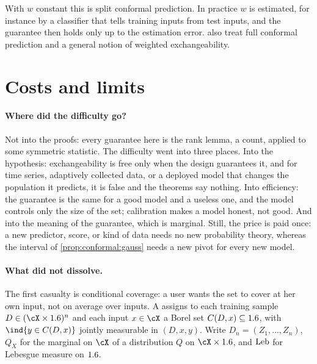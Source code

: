 \begin{refsection}
With $w$ constant this is split conformal prediction. In practice $w$ is estimated, for instance by a classifier that tells training inputs from test inputs, and the guarantee then holds only up to the estimation error. \textcite{Tibshirani2019} also treat full conformal prediction and a general notion of weighted exchangeability.

\section{Costs and limits}\label{sec:conformal:costs}

\paragraph{Where did the difficulty go?} Not into the proofs: every guarantee here is the rank lemma, a count, applied to some symmetric statistic. The difficulty went into three places. Into the hypothesis: exchangeability is free only when the design guarantees it, and for time series, adaptively collected data, or a deployed model that changes the population it predicts, it is false and the theorems say nothing. Into efficiency: the guarantee is the same for a good model and a useless one, and the model controls only the size of the set; calibration makes a model honest, not good. And into the meaning of the guarantee, which is marginal. Still, the price is paid once: a new predictor, score, or kind of data needs no new probability theory, whereas the interval of \cref{prop:conformal:gauss} needs a new pivot for every new model.

\paragraph{What did not dissolve.} The first casualty is conditional coverage: a user wants the set to cover at her own input, not on average over inputs. A  assigns to each training sample $D\in(\cX\times\R)^n$ and each input $x\in\cX$ a Borel set $C(D,x)\subseteq1.6$, with $\ind\{y\in C(D,x)\}$ jointly measurable in $(D,x,y)$. Write $D_n=(Z_1,\dots,Z_n)$, $Q_X$ for the marginal on $\cX$ of a distribution $Q$ on $\cX\times\R$, and $\operatorname{Leb}$ for Lebesgue measure on $1.6$.


\end{refsection}
